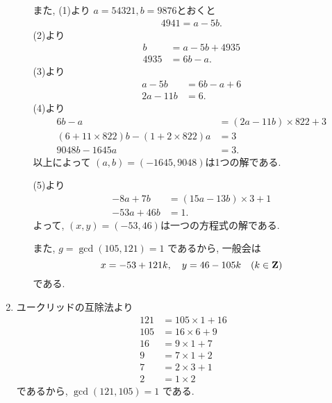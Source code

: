 \begin{enumerate}[6.1]
\begin{enumerate}[(a)]
  また, (1)より $a = 54321, b=9876$とおくと
  \begin{align*}
    4941 = a - 5b.
  \end{align*}
  (2)より
  \begin{align*}
    b &= a - 5b + 4935 \\
    4935 &= 6b - a.
  \end{align*}
  (3)より
  \begin{align*}
    a - 5b &= 6b - a + 6 \\
    2a - 11b &= 6.
  \end{align*}
  (4)より
  \begin{align*}
    6b - a &= (2a - 11b) \times 822 + 3 \\
    (6 + 11 \times 822)b - (1 + 2 \times 822)a &= 3 \\
    9048b - 1645a &= 3.
  \end{align*}
  以上によって $(a, b) = (-1645, 9048)$は1つの解である.

  (5)より
  \begin{align*}
    -8a + 7b &= (15a - 13b) \times 3 + 1 \\
    -53a + 46b &= 1.
  \end{align*}
  よって, $(x, y) = (-53, 46)$は一つの方程式の解である.

  また, $g = \gcd(105, 121) = 1$ であるから, 一般会は
  \[
    x = -53 + 121k, \quad
    y =  46 - 105k \quad (k \in \mathbf{Z})
  \]
  である.
  \end{enumerate}
  \item ユークリッドの互除法より
  \begin{align}
    121 &= 105 \times 1 + 16 \tag{1} \\
    105 &=  16 \times 6 + 9  \tag{2} \\
    16  &=   9 \times 1 + 7  \tag{3} \\
    9   &=   7 \times 1 + 2  \tag{4} \\
    7   &=   2 \times 3 + 1  \tag{5} \\
    2   &=   1 \times 2      \tag{6}
  \end{align}
  であるから, $\gcd(121, 105) = 1$ である.


\end{enumerate}
